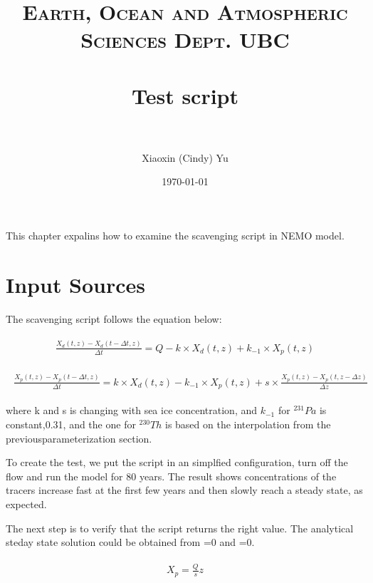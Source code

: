 \documentclass[paper=a4, fontsize=11pt]{scrartcl} %
\title{   
\normalfont \normalsize
\textsc{Earth, Ocean and Atmospheric Sciences Dept. UBC} \\ [25pt] %
\horrule{0.5pt} \\[0.4cm] %
\huge Test script \\ %
\horrule{2pt} \\[0.5cm] %
}
\author{Xiaoxin (Cindy) Yu} %
\date{\normalsize\today} %
\numberwithin{equation}{section} %
\numberwithin{figure}{section} %
\numberwithin{table}{section} %
\begin{document}
\maketitle %

This chapter expalins how to examine the scavenging script in NEMO model.
\section{Input Sources}

The scavenging script follows the equation below:

\begin{align}
\label{eq:dis}
\begin{split}
\frac{X_{d}(t,z)-X_{d}(t-\Delta t,z)}{\Delta t}=Q-k\times X_{d}(t,z)+k_{-1}\times X_{p}(t,z)
\end{split}
\end{align}

\begin{align}
\label{eq:part}
\begin{split}
\frac{X_{p}(t,z)-X_{p}(t-\Delta t,z)}{\Delta t}=k\times X_{d}(t,z)-k_{-1}\times X_{p}(t,z)+s\times \frac{X_{p}(t,z)-X_{p}(t,z-\Delta z)}{\Delta z}
\end{split}
\end{align}

where k and s is changing with sea ice concentration, and $k_{-1}$ for $^{231}Pa$ is constant,0.31, and the one for $^{230}Th$ is based on the interpolation from the previousparameterization section.  

To create the test, we put the script in an simplfied configuration, turn off the flow and run the model for 80 years. The result shows concentrations of the tracers increase fast at the first few years and then slowly reach a steady state, as expected.

 The next step is to verify that the script returns the right value. The analytical steday state solution could be obtained from =0 and =0.
 
\begin{align}
\label{eq:sol}
\begin{split}
X_{p} = \frac{Q}{s}z
\end{split}
\end{align}
\end{document}
